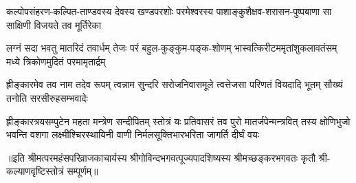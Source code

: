 \fourlineindentedshloka
{कल्पोपसंहरण-कल्पित-ताण्डवस्य}
{देवस्य खण्डपरशोः परमेश्वरस्य}
{पाशाङ्कुशैक्षव-शरासन-पुष्पबाणा}
{सा साक्षिणी विजयते तव मूर्तिरेका}%

\fourlineindentedshloka
{लग्नं सदा भवतु मातरिदं तवार्धम्}
{तेजः परं बहुल-कुङ्कुम-पङ्क-शोणम्}
{भास्वत्किरीटममृतांशुकलावतंसम्}
{मध्ये त्रिकोणमुदितं परमामृतार्द्रम्}%

\fourlineindentedshloka
{ह्रीङ्कारमेव तव नाम तदेव रूपम्}
{त्वन्नाम सुन्दरि सरोजनिवासमूले}
{त्वत्तेजसा परिणतं वियदादि भूतम्}
{सौख्यं तनोति सरसीरुहसम्भवादेः}%

\fourlineindentedshloka
{ह्रीङ्कारत्रयसम्पुटेन महता मन्त्रेण सन्दीपितम्}
{स्तोत्रं यः प्रतिवासरं तव पुरो मातर्जपेन्मन्त्रवित्}
{तस्य क्षोणिभुजो भवन्ति वशगा लक्ष्मीश्चिरस्थायिनी}
{वाणी निर्मलसूक्तिभारभरिता जागर्ति दीर्घं वयः}%
 
॥इति श्रीमत्परमहंसपरिव्राजकाचार्यस्य श्रीगोविन्दभगवत्पूज्यपादशिष्यस्य 
श्रीमच्छङ्करभगवतः कृतौ श्री-कल्याणवृष्टिस्तोत्रं  सम्पूर्णम्॥